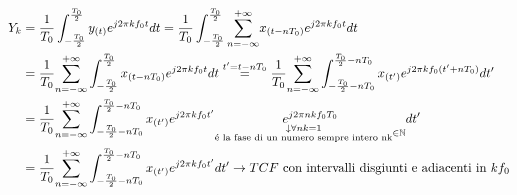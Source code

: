                    \begin{align}
                        Y_k &= \frac{1}{T_0} \int_{-\frac{T_0}{2}}^{\frac{T_0}{2}} y_{(t)} e^{j2\pi kf_0t} dt =\frac{1}{T_0} \int_{-\frac{T_0}{2}}^{\frac{T_0}{2}} \overunderset{+\infty}{n = -\infty}{\sum}x_{(t-nT_0)} e^{j2\pi kf_0t} dt \nonumber \\
                                &= \frac{1}{T_0} \overunderset{+\infty}{n = -\infty}{\sum} \int_{-\frac{T_0}{2}}^{\frac{T_0}{2}} x_{(t-nT_0)} e^{j2\pi kf_0t} dt \overset{t^\prime = t-nT_0}{=} \frac{1}{T_0} \overunderset{+\infty}{n = -\infty}{\sum} \int_{-\frac{T_0}{2}-nT_0}^{\frac{T_0}{2}-nT_0} x_{(t^\prime)} e^{j2\pi kf_0(t^\prime+nT_0)} dt^\prime  \nonumber \\
                                &= \frac{1}{T_0} \overunderset{+\infty}{n = -\infty}{\sum} \int_{-\frac{T_0}{2}-nT_0}^{\frac{T_0}{2}-nT_0} x_{(t^\prime)} e^{j2\pi kf_0t^\prime} \underset{\substack{\downarrow \forall nk=1 \\\text{é la fase di un numero sempre intero nk}}\in\mathbb{N}}{e^{j2\pi nkf_0T_0}} dt^\prime\nonumber \\
                                &= \frac{1}{T_0} \overunderset{+\infty}{n = -\infty}{\sum} \int_{-\frac{T_0}{2}-nT_0}^{\frac{T_0}{2}-nT_0} x_{(t^\prime)} e^{j2\pi kf_0t^\prime}dt^\prime \rightarrow \text{$TCF$ con intervalli disgiunti e adiacenti in $kf_0$}\nonumber 
                    \end{align}
